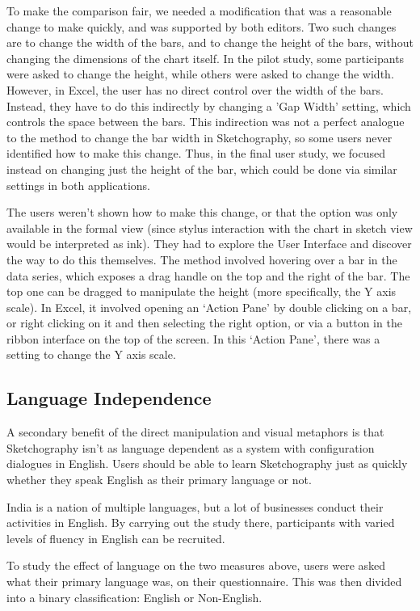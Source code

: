 To make the comparison fair, we needed a modification that was a reasonable change to make quickly, and was supported by both editors. Two such changes are to change the width of the bars, and to change the height of the bars, without changing the dimensions of the chart itself. In the pilot study, some participants were asked to change the height, while others were asked to change the width. However, in Excel, the user has no direct control over the width of the bars. Instead, they have to do this indirectly by changing a 'Gap Width' setting, which controls the space between the bars. This indirection was not a perfect analogue to the method to change the bar width in Sketchography, so some users never identified how to make this change. Thus, in the final user study, we focused instead on changing just the height of the bar, which could be done via similar settings in both applications.

The users weren't shown how to make this change, or that the option was only available in the formal view (since stylus interaction with the chart in sketch view would be interpreted as ink). They had to explore the User Interface and discover the way to do this themselves. The method involved hovering over a bar in the data series, which exposes a drag handle on the top and the right of the bar. The top one can be dragged to manipulate the height (more specifically, the Y axis scale). In Excel, it involved opening an `Action Pane' by double clicking on a bar, or right clicking on it and then selecting the right option, or via a button in the ribbon interface on the top of the screen. In this `Action Pane', there was a setting to change the Y axis scale.

\subsection*{Language Independence}
A secondary benefit of the direct manipulation and visual metaphors is that Sketchography isn't as language dependent as a system with configuration dialogues in English. Users should be able to learn Sketchography just as quickly whether they speak English as their primary language or not. 

India is a nation of multiple languages, but a lot of businesses conduct their activities in English. By carrying out the study there, participants with varied levels of fluency in English can be recruited.

To study the effect of language on the two measures above, users were asked what their primary language was, on their questionnaire. This was then divided into a binary classification: English or Non-English.

